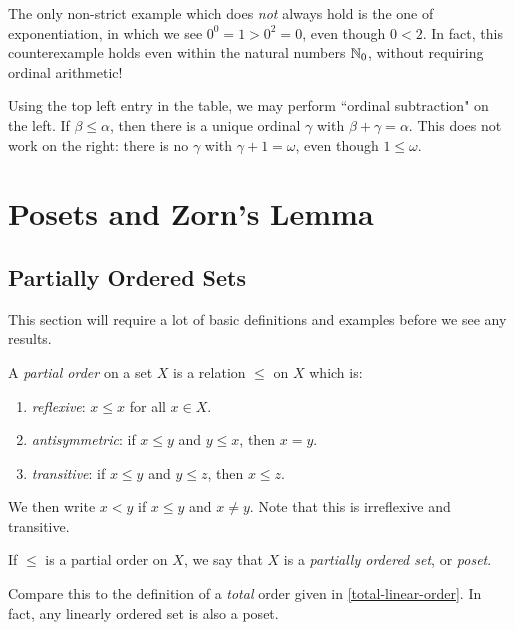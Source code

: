 \documentclass{article}
\begin{document}
\begin{note}
	The only non-strict example which does \textit{not} always hold is the one of exponentiation, in which we see $0^0 = 1 > 0^2 = 0$, even though $0 < 2$. In fact, this counterexample holds even within the natural numbers $\mathbb{N}_0$, without requiring ordinal arithmetic!
\end{note}

\begin{corollary}
    Using the top left entry in the table, we may perform ``ordinal subtraction" on the left. If $\beta \leq \alpha$, then there is a unique ordinal $\gamma$ with $\beta + \gamma = \alpha$. This does not work on the right: there is no $\gamma$ with $\gamma + 1 = \omega$, even though $1 \leq \omega$.
\end{corollary}

\pagebreak
\section{Posets and Zorn's Lemma}
\subsection{Partially Ordered Sets}

This section will require a lot of basic definitions and examples before we see any results.

\begin{definition}
    A \textit{partial order} on a set $X$ is a relation $\leq$ on $X$ which is:
    \begin{enumerate}
	    \item \textit{reflexive}: $x \leq x$ for all $x \in X$.
	    \item \textit{antisymmetric}: if $x \leq y$ and $y \leq x$, then $x = y$.
	    \item \textit{transitive}: if $x \leq y$ and $y \leq z$, then $x \leq z$.
	\end{enumerate}
	We then write $x < y$ if $x \leq y$ and $x \neq y$. Note that this is irreflexive and transitive.
	
	If $\leq$ is a partial order on $X$, we say that $X$ is a \textit{partially ordered set}, or \textit{poset}.
\end{definition}

\begin{note}
	Compare this to the definition of a \textit{total} order given in \ref{total-linear-order}. In fact, any linearly ordered set is also a poset.
\end{note}
\end{document}
